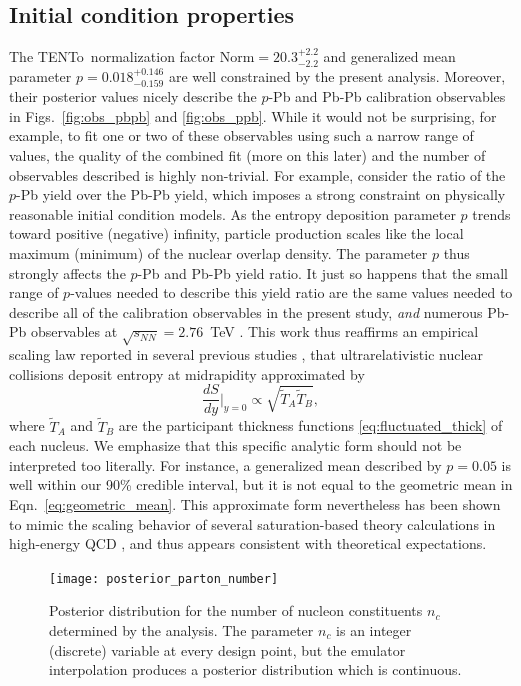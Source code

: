 \documentclass[aps,prc,reprint,amsmath,nofootinbib]{revtex4-1}
\newcommand{\trento}{T\raisebox{-0.5ex}{R}ENTo}
\newcommand{\sqrts}{\sqrt{s_{NN}}}
\newcommand{\T}{\tilde{T}}
\begin{document}
\subsection{Initial condition properties}

The \trento\ normalization factor ${\text{Norm} = 20.3^{+2.2}_{-2.2}}$ and generalized mean parameter $p=0.018^{+0.146}_{-0.159}$ are well constrained by the present analysis.
Moreover, their posterior values nicely describe the $p$-Pb and Pb-Pb calibration observables in Figs.~\ref{fig:obs_pbpb} and \ref{fig:obs_ppb}.
While it would not be surprising, for example, to fit one or two of these observables using such a narrow range of values, the quality of the combined fit (more on this later) and the number of observables described is highly non-trivial.
For example, consider the ratio of the $p$-Pb yield over the Pb-Pb yield, which imposes a strong constraint on physically reasonable initial condition models.
As the entropy deposition parameter $p$ trends toward positive (negative) infinity, particle production scales like the local maximum (minimum) of the nuclear overlap density.
The parameter $p$ thus strongly affects the $p$-Pb and Pb-Pb yield ratio.
It just so happens that the small range of $p$-values needed to describe this yield ratio are the same values needed to describe all of the calibration observables in the present study, \emph{and} numerous Pb-Pb observables at $\sqrts=2.76$~TeV \cite{Bernhard:2018hnz}.
This work thus reaffirms an empirical scaling law reported in several previous studies \cite{Moreland:2014oya, Bernhard:2016tnd, Ke:2016jrd, Bernhard:2018hnz},
that ultrarelativistic nuclear collisions deposit entropy at midrapidity approximated by
\begin{equation}
  \label{eq:geometric_mean}
  \frac{dS}{dy}\bigg\vert_{y=0} \propto \sqrt{\T_A \T_B},
\end{equation}
where $\T_A$ and $\T_B$ are the participant thickness functions \eqref{eq:fluctuated_thick} of each nucleus.
We emphasize that this specific analytic form should not be interpreted too literally.
For instance, a generalized mean described by $p=0.05$ is well within our 90\% credible interval, but it is not equal to the geometric mean in Eqn.~\ref{eq:geometric_mean}.
This approximate form nevertheless has been shown to mimic the scaling behavior of several saturation-based theory calculations in high-energy QCD \cite{Bernhard:2016tnd}, and thus appears consistent with theoretical expectations.

\begin{figure}[b]
  \texttt{[image: posterior\_parton\_number]}
  \caption{
    \label{fig:posterior_parton_number}
    Posterior distribution for the number of nucleon constituents $n_c$ determined by the analysis.
    The parameter $n_c$ is an integer (discrete) variable at every design point, but the emulator interpolation produces a posterior distribution which is continuous.
  }
\end{figure}
\end{document}
